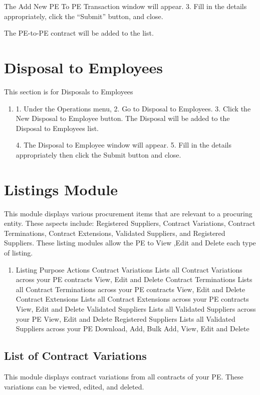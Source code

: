 \documentclass [12pt]{book}
\begin{document}
\begin{enumerate}
\begin{enumerate}
\begin{enumerate}
The Add New PE To PE Transaction window will appear.
3.	Fill in the details appropriately, click the “Submit” button, and close.
\end{enumerate}

 
The PE-to-PE contract will be added to the list.

\section {Disposal to Employees}
This section is for Disposals to Employees 
\begin{enumerate}
    \item 
1.	Under the Operations menu,
2.	Go to Disposal to Employees.
3.	Click the New Disposal to Employee button.
The Disposal will be added to the Disposal to Employees list.
 
4.	The Disposal to Employee window will appear.
5.	Fill in the details appropriately then click the Submit button and close.
\end{enumerate}


\section{Listings Module}
This module displays various procurement items that are relevant to a procuring entity.
These aspects include: Registered Suppliers, Contract Variations, Contract Terminations, Contract Extensions, Validated Suppliers, and Registered Suppliers.
These listing modules allow the PE to View ,Edit and Delete each type of listing.
\begin{enumerate}
    \item 
Listing 	Purpose	Actions
Contract Variations	Lists all Contract Variations across your PE contracts	View, Edit and Delete
Contract Terminations	Lists all Contract Terminations across your PE contracts	View, Edit and Delete
Contract Extensions	Lists all Contract Extensions across your PE contracts	View, Edit and Delete
Validated Suppliers	Lists all Validated Suppliers across your PE	View, Edit and Delete
Registered Suppliers	Lists all Validated Suppliers across your PE	Download, Add, Bulk Add, View, Edit and Delete
\end{enumerate}

\subsection{List of Contract Variations}
This module displays contract variations from all contracts of your PE.
These variations can be viewed, edited, and deleted.


\end{enumerate}
\end{enumerate}
\end{document}
